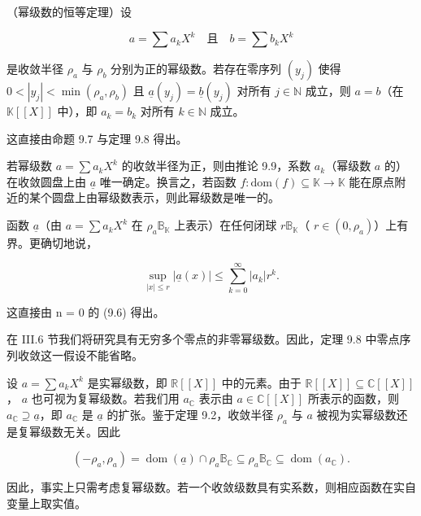 \begin{corollary}

（幂级数的恒等定理）设

\[
a=\sum a_{k}X^{k}\quad\text{且}\quad b=\sum b_{k}X^{k}
\]

是收敛半径  $ \rho_a $ 与  $ \rho_b $ 分别为正的幂级数。若存在零序列  $ (y_j) $ 使得  $ 0 < |y_j| < \min(\rho_a, \rho_b) $ 且  $ \underline{a}(y_j) = \underline{b}(y_j) $ 对所有  $ j \in \mathbb{N} $ 成立，则  $ a = b $（在  $ \mathbb{K}[\![X]\!] $ 中），即  $ a_k = b_k $ 对所有  $ k \in \mathbb{N} $ 成立。

\proofhead
这直接由命题 9.7 与定理 9.8 得出。
\end{corollary}

\begin{remark}

\begin{items}
\item

若幂级数  $ a = \sum a_k X^k $ 的收敛半径为正，则由推论 9.9，系数  $ a_k $（幂级数  $ a $ 的）在收敛圆盘上由  $ \underline{a} $ 唯一确定。换言之，若函数  $ f: \text{dom}(f) \subseteq \mathbb{K} \to \mathbb{K} $ 能在原点附近的某个圆盘上由幂级数表示，则此幂级数是唯一的。

\item

函数  $ \underline{a} $（由  $ a = \sum a_k X^k $ 在  $ \rho_a \mathbb{B}_{\mathbb{K}} $ 上表示）在任何闭球  $ r \mathbb{B}_{\mathbb{K}} $（ $ r \in (0, \rho_a) $）上有界。更确切地说，

\[
\sup_{|x|\leq r}\left|\underline{a}(x)\right|\leq\sum_{k=0}^{\infty}\left|a_{k}\right|r^{k}.
\]

\proofhead
这直接由 n = 0 的 (9.6) 得出。
\item

在 III.6 节我们将研究具有无穷多个零点的非零幂级数。因此，定理 9.8 中零点序列收敛这一假设不能省略。

\item

设  $ a = \sum a_k X^k $ 是实幂级数，即  $ \mathbb{R}[\![X]\!] $ 中的元素。由于  $ \mathbb{R}[\![X]\!] \subseteq \mathbb{C}[\![X]\!] $， $ a $ 也可视为复幂级数。若我们用  $ a_{\mathbb{C}} $ 表示由  $ a \in \mathbb{C}[\![X]\!] $ 所表示的函数，则  $ a_{\mathbb{C}} \supseteq \underline{a} $，即  $ a_{\mathbb{C}} $ 是  $ \underline{a} $ 的扩张。鉴于定理 9.2，收敛半径  $ \rho_a $ 与  $ a $ 被视为实幂级数还是复幂级数无关。因此

\[
(-\rho_{a},\rho_{a})=\operatorname{d o m}(\underline{{a}})\cap\rho_{a}\mathbb{B}_{\mathbb{C}}\subseteq\rho_{a}\mathbb{B}_{\mathbb{C}}\subseteq\operatorname{d o m}(a_{\mathbb{C}}).
\]

因此，事实上只需考虑复幂级数。若一个收敛级数具有实系数，则相应函数在实自变量上取实值。

\end{items}

\end{remark}


